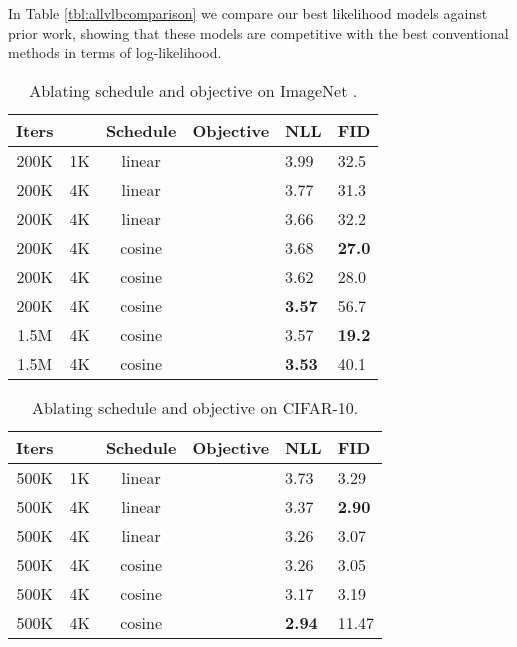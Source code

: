 \documentclass{article}
\begin{document}
In Table \ref{tbl:allvlbcomparison} we compare our best likelihood models against prior work, showing that these models are competitive with the best conventional methods in terms of log-likelihood.

\begin{table}[t]
    \caption{\label{tbl:improvementcomparison} Ablating schedule and objective on ImageNet .}
    \centering
    \vskip 0.15in
	\begin{center}
	\begin{small}
    \begin{tabular}{ccccll}
    	\toprule
        Iters &  & Schedule & Objective & NLL & FID \\ 
		\midrule
        200K & 1K & linear &  & 3.99 & 32.5 \\
        200K & 4K & linear &  & 3.77 & 31.3 \\
		\midrule
        200K & 4K & linear &  & 3.66 & 32.2 \\
        200K & 4K & cosine &  & 3.68 & \bf 27.0 \\
        200K & 4K & cosine &  & 3.62 & 28.0 \\
        200K & 4K & cosine &  & \bf 3.57 & 56.7 \\
        \midrule
        1.5M & 4K & cosine &  & 3.57 & \bf 19.2 \\
        1.5M & 4K & cosine &  & \bf 3.53 & 40.1 \\
        \bottomrule
    \end{tabular}
    \end{small}
    \end{center}
    \vskip -0.1in
\end{table}

\begin{table}[t]
    \caption{\label{tbl:cifar_improvementcomparison} Ablating schedule and objective on CIFAR-10.}
    \centering
    \vskip 0.15in
	\begin{center}
	\begin{small}
    \begin{tabular}{ccccll}
    	\toprule
        Iters &  & Schedule & Objective & NLL & FID \\ 
        \midrule
        500K & 1K & linear &  & 3.73 & 3.29 \\
        500K & 4K & linear &  & 3.37 & \bf 2.90 \\
        \midrule
        500K & 4K & linear &  & 3.26 & 3.07 \\
        500K & 4K & cosine &  & 3.26 & 3.05 \\
        500K & 4K & cosine &  & 3.17 & 3.19 \\
        500K & 4K & cosine &  & \bf 2.94 & 11.47 \\
        \bottomrule
    \end{tabular}
    \end{small}
    \end{center}
    \vskip -0.1in
\end{table}
\end{document}
